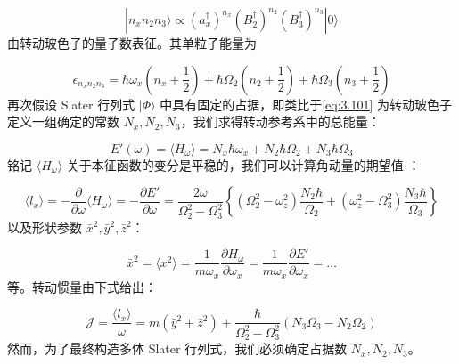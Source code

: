 \begin{equation}
|n_{x}n_{2}n_{3}\rangle\propto\left(a^{\dagger}_{x}\right)^{n_{x}}\left(B^{\dagger}_{2}\right)^{n_{2}}\left(B^{\dagger}_{3}\right)^{n_{3}}|0\rangle\label{eq:3.114}
\end{equation}
由转动玻色子的量子数表征。其单粒子能量为

\begin{equation}
\epsilon_{n_{x}n_{2}n_{3}}=\hbar\omega_{x}\left(n_{x}+\frac{1}{2}\right)+\hbar\Omega_{2}\left(n_{2}+\frac{1}{2}\right)+\hbar\Omega_{3}\left(n_{3}+\frac{1}{2}\right)\label{eq:3.115}
\end{equation}
再次假设 Slater 行列式 $|\Phi\rangle$ 中具有固定的占据，即类比于\ref{eq:3.101} 为转动玻色子定义一组确定的常数
$N_{x},N_{2},N_{3}$，我们求得转动参考系中的总能量：

\begin{equation}
E'(\omega)=\langle H_{\omega}\rangle=N_{x}\hbar\omega_{x}+N_{2}\hbar\Omega_{2}+N_{3}\hbar\Omega_{3}\label{eq:3.116}
\end{equation}
铭记 $\langle H_{\omega}\rangle$ 关于本征函数的变分是平稳的，我们可以计算角动量的期望值 \cite{RBK75}：

\begin{equation}
\langle l_{x}\rangle=-\frac{\partial}{\partial\omega}\langle H_{\omega}\rangle=-\frac{\partial E'}{\partial\omega}=\frac{2\omega}{\Omega^{2}_{2}-\Omega^{2}_{3}}\left\{ \left(\Omega^{2}_{2}-\omega^{2}_{z}\right)\frac{N_{2}\hbar}{\Omega_{2}}+\left(\omega^{2}_{z}-\Omega^{2}_{3}\right)\frac{N_{3}\hbar}{\Omega_{3}}\right\} \label{eq:3.117}
\end{equation}
以及形状参数 $\bar{x}^{2},\bar{y}^{2},\bar{z}^{2}$：

\begin{equation}
\bar{x}^{2}=\langle x^{2}\rangle=\frac{1}{m\omega_{x}}\frac{\partial H_{\omega}}{\partial\omega_{x}}=\frac{1}{m\omega_{x}}\frac{\partial E'}{\partial\omega_{x}}=\dots\label{eq:3.118}
\end{equation}
等。转动惯量由下式给出：

\begin{equation}
\mathcal{J}=\frac{\langle l_{x}\rangle}{\omega}=m\left(\bar{y}^{2}+\bar{z}^{2}\right)+\frac{\hbar}{\Omega^{2}_{2}-\Omega^{2}_{3}}\left(N_{3}\Omega_{3}-N_{2}\Omega_{2}\right)\label{eq:3.119}
\end{equation}
然而，为了最终构造多体 Slater 行列式，我们必须确定占据数 $N_{x},N_{2},N_{3}$。

